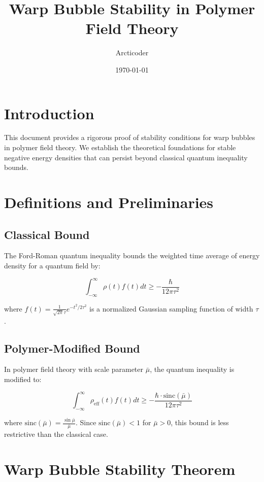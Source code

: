 \documentclass{article}
\title{Warp Bubble Stability in Polymer Field Theory}
\author{Arcticoder}
\date{\today}
\begin{document}
\maketitle

\section{Introduction}

This document provides a rigorous proof of stability conditions for warp bubbles in polymer field theory. We establish the theoretical foundations for stable negative energy densities that can persist beyond classical quantum inequality bounds.

\section{Definitions and Preliminaries}

\subsection{Classical Bound}

The Ford-Roman quantum inequality bounds the weighted time average of energy density for a quantum field by:

\begin{equation}
\int_{-\infty}^{\infty} \rho(t) f(t) dt \geq -\frac{\hbar}{12\pi \tau^2}
\end{equation}

where $f(t) = \frac{1}{\sqrt{2\pi}\tau} e^{-t^2/2\tau^2}$ is a normalized Gaussian sampling function of width $\tau$.

\subsection{Polymer-Modified Bound}

In polymer field theory with scale parameter $\bar{\mu}$, the quantum inequality is modified to:

\begin{equation}
\int_{-\infty}^{\infty} \rho_{\text{eff}}(t) f(t) dt \geq -\frac{\hbar \cdot \text{sinc}(\bar{\mu})}{12\pi \tau^2}
\end{equation}

where $\text{sinc}(\bar{\mu}) = \frac{\sin \bar{\mu}}{\bar{\mu}}$. Since $\text{sinc}(\bar{\mu}) < 1$ for $\bar{\mu} > 0$, this bound is less restrictive than the classical case.

\section{Warp Bubble Stability Theorem}
\end{document}
